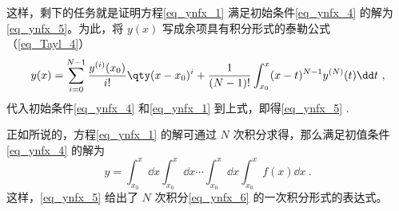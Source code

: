 这样，剩下的任务就是证明方程\autoref{eq_ynfx_1} 满足初始条件\autoref{eq_ynfx_4} 的解为\autoref{eq_ynfx_5}。为此，将 $y(x)$ 写成余项具有积分形式的泰勒公式（\autoref{eq_Tayl_4}）
\begin{equation}
y(x)=\sum_{i=0}^{N-1}\frac{y^{(i)}(x_0)}{i!}\qty(x-x_0)^{i}+\frac{1}{(N-1)!}\int_{x_0}^{x}(x-t)^{N-1}y^{(N)}(t)\dd t~,
\end{equation}
代入初始条件\autoref{eq_ynfx_4} 和\autoref{eq_ynfx_1} 到上式，即得\autoref{eq_ynfx_5} .

正如所说的，方程\autoref{eq_ynfx_1} 的解可通过 $N$ 次积分求得，那么满足初值条件\autoref{eq_ynfx_4} 的解为
\begin{equation}\label{eq_ynfx_6}
y=\int_{x_0}^x\dd x\int_{x_0}^x\dd x\cdots\int_{x_0}^{x}\dd x\int_{x_0}^{x}f(x)\dd x~.
\end{equation}
这样，\autoref{eq_ynfx_5} 给出了 $N$ 次积分\autoref{eq_ynfx_6} 的一次积分形式的表达式。
